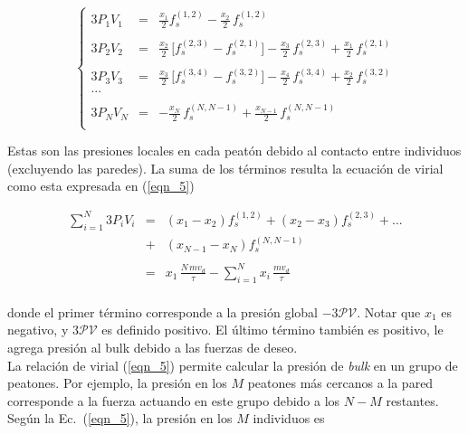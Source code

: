 \begin{equation}
\left\{\begin{array}{lcl}
3P_1V_1 
& = &\displaystyle\frac{x_{1}}{2}f_s^ { (1 , 2)} - 
\displaystyle\frac{x_{2}}{2}\,f_s^ { (1 , 2) }  \\
&& \\
3P_2V_2 
& = &\displaystyle\frac{x_{2}}{2}\,\big[f_s^ { (2 , 3)} - f_s^{(2,1)} 
\big] - \displaystyle\frac{x_{3}}{2}\,f_s^ { (2 , 3) } +\displaystyle\frac 
{ x_ {1}}{2}\,f_s^{(2,1) 
} \\
&& \\
3P_3V_3 
& = &\displaystyle\frac{x_{3}}{2}\,\big[f_s^ { (3 , 4)} - f_s^{(3,2)} 
\big] - \displaystyle\frac{x_{4}}{2}\,f_s^ { (3 , 4) } +\displaystyle\frac 
{ x_{2}}{2}\,f_s^{(3,2) 
} \\
... &&\\
&& \\
3P_NV_N 
& = &-\displaystyle\frac{x_{N}}{2}\, f_s^{(N,N-1)} 
+\displaystyle\frac{ x_{N-1}}{2}\,f_s^{(N,N-1) 
} \\
 \end{array}\right.\label{eqn_11}
\end{equation}

Estas son las presiones locales en cada peatón debido al contacto entre individuos (excluyendo las paredes). La suma de los términos resulta la ecuación de virial como esta expresada en (\ref{eqn_5})

\begin{equation}
\begin{array}{lcl}
\displaystyle\sum_{i=1}^N 3P_iV_i & = & (x_1 - x_2)f_s^{(1,2)} + (x_2 - 
x_3)f_s^{(2,3)} +... \\
& + &  (x_{N-1}-x_N)f_s^{(N,N-1)} \\
&& \\
& = & x_{1}\,\displaystyle\frac{N\,mv_d}{\tau} - 
\displaystyle\sum_{i=1}^N x_i\,\displaystyle\frac{mv_d}{\tau} \\
 \end{array}\label{eqn_12}
\end{equation}

\noindent donde el primer término corresponde a la presión global
$-3\mathcal{PV}$. Notar que $x_1$ es negativo, y $3\mathcal{PV}$ es definido positivo. El último término también es positivo, le agrega presión al bulk debido a las fuerzas de deseo.  
\\
La relación de virial (\ref{eqn_5}) permite calcular la presión de \textit{bulk} en un grupo de peatones. Por ejemplo, la presión en los  $M$ peatones más cercanos a la pared corresponde a la fuerza actuando en este grupo debido a los $N-M$ restantes. Según la Ec.~(\ref{eqn_5}), la presión en los $M$ individuos es


